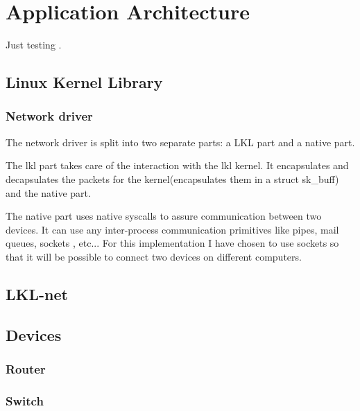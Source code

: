 \chapter{Application Architecture}
\label{chapter:arch}

Just testing \cite{linnetarch}.

\section{Linux Kernel Library}
\label{sec:lkl}

\subsection{Network driver}
\label{sec:net-driver}

The network driver is split into two separate parts: a LKL part and a native part.

The lkl part takes care of the interaction with the lkl kernel. It encapsulates
and decapsulates the packets for the kernel(encapsulates them in a struct sk_buff)
and the native part.

The native part uses native syscalls to assure communication between two devices.
It can use any inter-process communication primitives like pipes, mail queues, sockets
, etc... For this implementation I have chosen to use sockets so that it will be possible
to connect two devices on different computers.


\section{LKL-net}
\label{sec:lkl-net}


\section{Devices}
\label{sec:devices}

\subsection{Router}
\label{sub-sec:router}

\subsection{Switch}
\label{sub-sec:switch}

